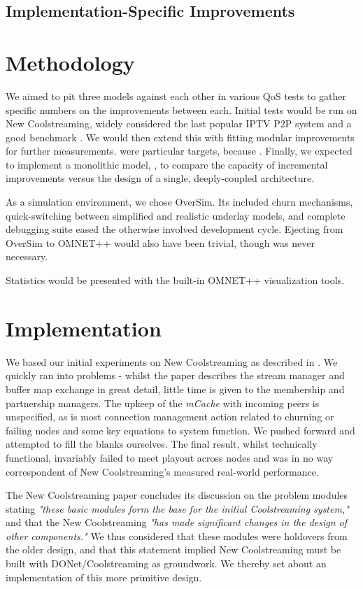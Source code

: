 \documentclass[12pt,a4paper]{article}
\begin{document}
\subsection{Implementation-Specific Improvements}
\section{Methodology}
We aimed to pit three models against each other in various QoS tests  to gather specific numbers on the improvements between each. Initial tests would be run on New Coolstreaming, widely considered the last popular IPTV P2P system and a good benchmark . We would then extend this with fitting modular improvements for further measurements.  were particular targets, because . Finally, we expected to implement a monolithic model, , to compare the capacity of incremental improvements versus the design of a single, deeply-coupled architecture.

As a simulation environment, we chose OverSim. Its included churn mechanisms, quick-switching between simplified and realistic underlay models, and complete debugging suite eased the otherwise involved development cycle. Ejecting from OverSim to OMNET++ would also have been trivial, though was never necessary.

Statistics would be presented with the built-in OMNET++ visualization tools.

\section{Implementation}
We based our initial experiments on New Coolstreaming as described in \cite{Li2008}. We quickly ran into problems - whilst the paper describes the stream manager and buffer map exchange in great detail, little time is given to the membership and partnership managers. The upkeep of the \textit{mCache} with incoming peers is unspecified, as is most connection management action related to churning or failing nodes and some key equations to system function. We pushed forward and attempted to fill the blanks ourselves. The final result, whilst technically functional, invariably failed to meet playout across nodes and was in no way correspondent of New Coolstreaming's measured real-world performance.

The New Coolstreaming paper concludes its discussion on the problem modules stating \textit{"these basic modules form the base for the initial Coolstreaming system,"} and that the New Coolstreaming \textit{"has made significant changes in the design of other components."} We thus considered that these modules were holdovers from the older design, and that this statement implied New Coolstreaming must be built with  DONet/Coolstreaming as groundwork. We thereby set about an implementation of this more primitive design.
\end{document}

